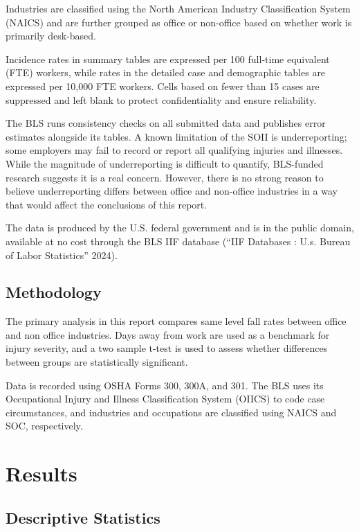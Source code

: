 \documentclass[
  letterpaper,
  DIV=11,
  numbers=noendperiod]{scrreprt}
\begin{document}
Industries are classified using the North American Industry
Classification System (NAICS) and are further grouped as office or
non-office based on whether work is primarily desk-based.

Incidence rates in summary tables are expressed per 100 full-time
equivalent (FTE) workers, while rates in the detailed case and
demographic tables are expressed per 10,000 FTE workers. Cells based on
fewer than 15 cases are suppressed and left blank to protect
confidentiality and ensure reliability.

The BLS runs consistency checks on all submitted data and publishes
error estimates alongside its tables. A known limitation of the SOII is
underreporting; some employers may fail to record or report all
qualifying injuries and illnesses. While the magnitude of underreporting
is difficult to quantify, BLS-funded research suggests it is a real
concern. However, there is no strong reason to believe underreporting
differs between office and non-office industries in a way that would
affect the conclusions of this report.

The data is produced by the U.S. federal government and is in the public
domain, available at no cost through the BLS IIF database ({``{IIF}
Databases : U.s. Bureau of Labor Statistics''} 2024).

\section{Methodology}\label{methodology}

The primary analysis in this report compares same level fall rates
between office and non office industries. Days away from work are used
as a benchmark for injury severity, and a two sample t-test is used to
assess whether differences between groups are statistically significant.

Data is recorded using OSHA Forms 300, 300A, and 301. The BLS uses its
Occupational Injury and Illness Classification System (OIICS) to code
case circumstances, and industries and occupations are classified using
NAICS and SOC, respectively.


\chapter{Results}\label{sec-results}

\section{Descriptive Statistics}\label{descriptive-statistics}
\end{document}
